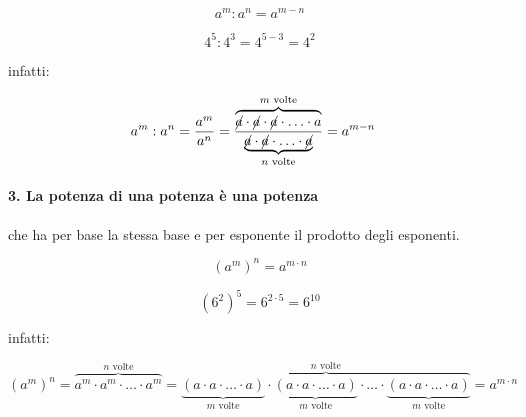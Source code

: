 \begin{minipage}[h]{.35\textwidth}
\vspace{4.5mm}
\[\boxed{a^m : a^n = a^{m-n}}\]
\end{minipage}\hfil
\begin{minipage}[h]{.35\textwidth}
\[4^5 : 4^3 = 4^{5 - 3} = 4^2\]
\end{minipage}
\hfil
\begin{minipage}[c]{.25\textwidth}
\vspace{4.5mm}
\centering infatti:
\end{minipage}
% 
%

\begin{align*}
 a^m: a^n &= \frac{a^m}{a^n}=
 \frac{\overbrace{\cancel{a} \cdot \cancel{a} \cdot \cancel{a} \cdot 
                  \ldots \cdot a}^{m \text{ volte}}}
 {\underbrace{\cancel{a} \cdot \cancel{a} \cdot
                  \ldots \cdot \cancel{a}}_{n \text{ volte}}}=
 a^{m-n}
\end{align*}
\vspace{-1em}
\paragraph{3. La potenza di una potenza è una potenza} 
che ha per base la stessa base e per esponente il prodotto degli esponenti.

\begin{minipage}[h]{.35\textwidth}
\vspace{4.5mm}
\[\boxed{(a^m)^n=a^{m \cdot n}}\]
\end{minipage}\hfil
\begin{minipage}[h]{.35\textwidth}
\[(6^2)^5=6^{2\cdot 5}=6^{10}\]
\end{minipage}
\hfil
\begin{minipage}[c]{.25\textwidth}
\vspace{4.5mm}
\centering infatti:
\end{minipage}
\[ (a^m)^n =\overbrace{a^m\cdot a^m\cdot\ldots\cdot a^m}^{n\text{ volte}}%
 =\overbrace{\underbrace{(a\cdot a\cdot\ldots\cdot a)}_{m\text{ 
volte}}\cdot%
   \underbrace{(a\cdot a\cdot\ldots\cdot a)}_{m\text{ 
volte}}\cdot\ldots\cdot%
   \underbrace{(a\cdot a\cdot\ldots\cdot a)}_{m\text{ 
volte}}}^{n\text{ volte}}%
   =a^{m\cdot n}\]
\vspace{-1.5em}
